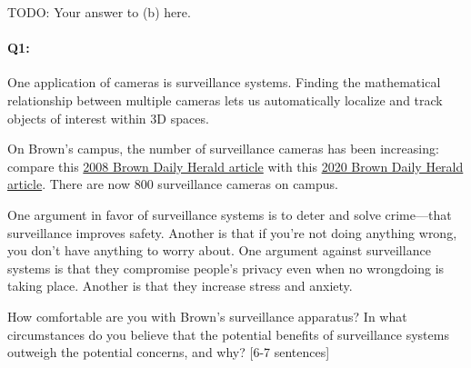 \begin{enumerate}[(a)]
\begin{enumerate} [(a)]
\begin{tcolorbox}[colback=white!5!white,colframe=green!75!black]
{{    TODO: Your answer to (b) here.

    }}
\end{tcolorbox}

\end{enumerate}

\end{enumerate}







\pagebreak 
\paragraph{Q1:} One application of cameras is surveillance systems. Finding the mathematical relationship between multiple cameras lets us automatically localize and track objects of interest within 3D spaces.

On Brown's campus, the number of surveillance cameras has been increasing: compare this \href{https://www.browndailyherald.com/2008/01/10/surveillance-cameras-on-campus-triple/}{2008 Brown Daily Herald article} with this \href{https://www.browndailyherald.com/2020/02/21/cameras-installed-hegeman-hall/}{2020 Brown Daily Herald article}. There are now 800 surveillance cameras on campus.

One argument in favor of surveillance systems is to deter and solve crime---that surveillance improves safety. Another is that if you're not doing anything wrong, you don't have anything to worry about. One argument against surveillance systems is that they compromise people's privacy even when no wrongdoing is taking place. Another is that they increase stress and anxiety.

How comfortable are you with Brown's surveillance apparatus?
In what circumstances do you believe that the potential benefits of surveillance systems outweigh the potential concerns, and why? [6-7 sentences]

